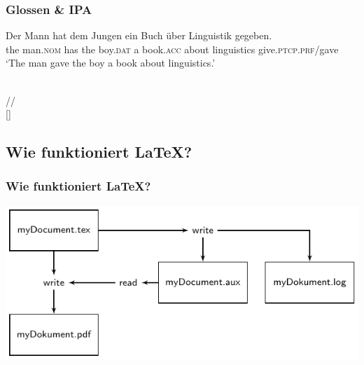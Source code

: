 \begin{frame}
\frametitle{Glossen \& IPA}

\ea 
\gll Der Mann hat dem Jungen ein Buch über Linguistik gegeben.\\
the man.\textsc{nom} has the boy.\textsc{dat} a book.\textsc{acc} about linguistics give.\textsc{ptcp.prf}/gave\\
\glt `The man gave the boy a book about linguistics.' 

\ex {} \\
{/}/ \\
{[}] \\
\z 

\end{frame}




\subsection{Wie funktioniert \LaTeX ?}

\begin{frame}
\frametitle{Wie funktioniert \LaTeX ?}

\includegraphics[width=\linewidth]{../../texfiles-beamer/tex-material/WissArb-latex/LaTeX-flowchart-1.pdf}

\end{frame}


